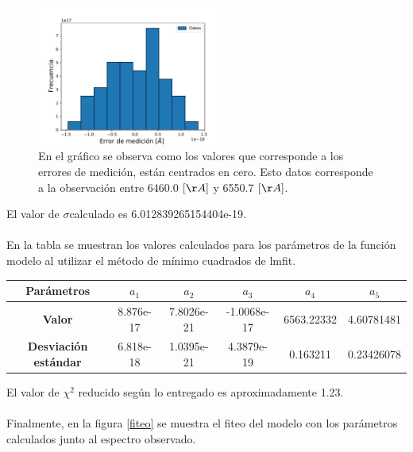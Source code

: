 \documentclass[letterpaper,oneside]{article}
\begin{document}
\begin{figure}
    \centering    
    \includegraphics[width=0.55\textwidth]{Tarea 6/Histograma.pdf}
    \caption{En el gráfico se observa como los valores que corresponde a los errores de medición, están centrados en cero. Esto datos corresponde a la observación entre 6460.0 $[\AA]$ y 6550.7 $[\AA]$.}
    \label{histograma}
\end{figure}{}
El valor de $\sigma $calculado es 6.012839265154404e-19. 
\\ \\
En la tabla se muestran los valores calculados para los parámetros de la función modelo al utilizar el método de mínimo cuadrados de lmfit. 
\begin{table}
\begin{tabular}{|c|c|c|c|c|c|}
\hline
\textbf{Parámetros}          & \textbf{$a_1$} & \textbf{$a_2$} & \textbf{$a_3$} & \textbf{$a_4$} & \textbf{$a_5$} \\ \hline
\textbf{Valor}               & 8.876e-17      & 7.8026e-21     & -1.0068e-17    & 6563.22332     & 4.60781481     \\ \hline
\textbf{Desviación estándar} & 6.818e-18      & 1.0395e-21     & 4.3879e-19     & 0.163211       & 0.23426078     \\ \hline
\end{tabular}
\end{table}
El valor de $\chi^2$ reducido según lo entregado es aproximadamente 1.23.
\\ \\ 
Finalmente, en la figura \ref{fiteo} se muestra el fiteo del modelo con los parámetros calculados junto al espectro observado. 
\end{document}
